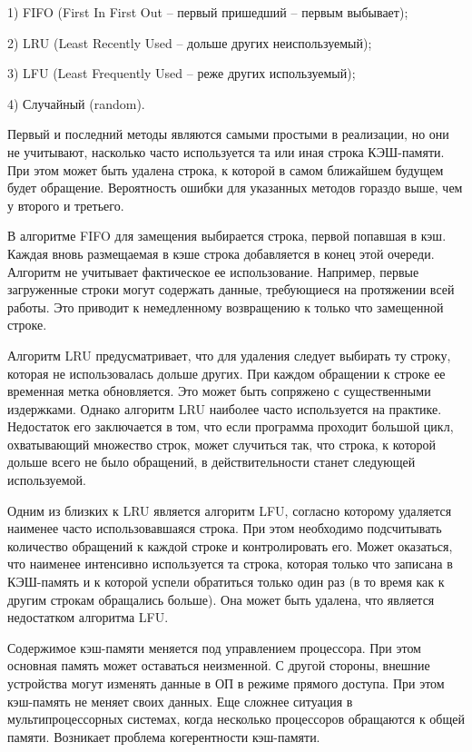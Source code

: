 \documentclass[13pt]{article}
\begin{document}
1) FIFO (First In First Out – первый пришедший – первым выбывает);

2) LRU (Least Recently Used – дольше других неиспользуемый);

3) LFU (Least Frequently Used – реже других используемый);

4) Случайный (random).

Первый и последний методы являются самыми простыми в реализации, но они не учитывают, насколько часто используется та или иная строка КЭШ-памяти. При этом может быть удалена строка, к которой в самом ближайшем будущем будет обращение. Вероятность ошибки для указанных методов гораздо выше, чем у второго и третьего.

В алгоритме FIFO для замещения выбирается строка, первой попавшая в кэш. Каждая вновь размещаемая в кэше строка добавляется в конец этой очереди. Алгоритм не учитывает фактическое ее использование. Например, первые загруженные строки могут содержать данные, требующиеся на протяжении всей работы. Это приводит к немедленному возвращению к только что замещенной строке.

Алгоритм LRU предусматривает, что для удаления следует выбирать ту строку, которая не использовалась дольше других. При каждом обращении к строке ее временная метка обновляется. Это может быть сопряжено с существенными издержками. Однако алгоритм LRU наиболее часто используется на практике. Недостаток его заключается в том, что если программа проходит большой цикл, охватывающий множество строк, может случиться так, что строка, к которой дольше всего не было обращений, в действительности станет следующей используемой.

Одним из близких к LRU является алгоритм LFU, согласно которому удаляется наименее часто использовавшаяся строка. При этом необходимо подсчитывать количество обращений к каждой строке и контролировать его. Может оказаться, что наименее интенсивно используется та строка, которая только что записана в КЭШ-память и к которой успели обратиться только один раз (в то время как к другим строкам обращались больше). Она может быть удалена, что является недостатком алгоритма LFU.

Содержимое кэш-памяти меняется под управлением процессора. При этом основная память может оставаться неизменной. С другой стороны, внешние устройства могут изменять данные в ОП в режиме прямого доступа. При этом кэш-память не меняет своих данных. Еще сложнее ситуация в мультипроцессорных системах, когда несколько процессоров обращаются к общей памяти. Возникает проблема когерентности кэш-памяти.
\end{document}
